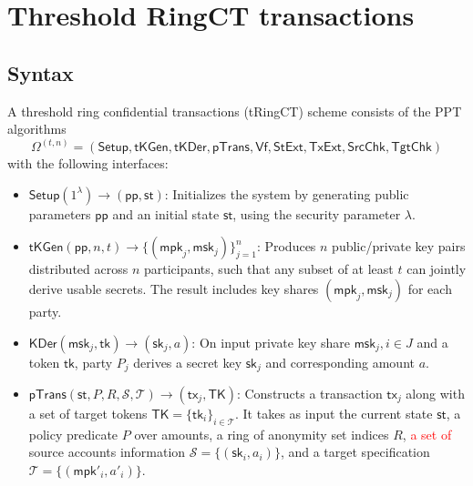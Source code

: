 
\section{Threshold RingCT transactions}

\subsection{Syntax}
\begin{definition}
A threshold ring confidential transactions (\textsf{tRingCT}) scheme consists of the PPT algorithms
\[
\Omega^{(t,n)} = (\textsf{Setup}, \textsf{tKGen}, \textsf{tKDer}, \textsf{pTrans}, \textsf{Vf}, \textsf{StExt}, \textsf{TxExt}, \textsf{SrcChk}, \textsf{TgtChk})
\]
with the following interfaces:

\begin{itemize}
    \item $\mathsf{Setup}(1^\lambda) \rightarrow (\mathsf{pp}, \mathsf{st})$: Initializes the system by generating public parameters $\mathsf{pp}$ and an initial state $\mathsf{st}$, using the security parameter $\lambda$.

    \item $\mathsf{tKGen}(\mathsf{pp}, n, t) \rightarrow \{(\mathsf{mpk}_j, \mathsf{msk}_j)\}_{j=1}^n$: Produces $n$ public/private key pairs distributed across $n$ participants, such that any subset of at least $t$ can jointly derive usable secrets. The result includes key shares $(\mathsf{mpk}_j, \mathsf{msk}_j)$ for each party.

    \item $\mathsf{KDer}(\mathsf{msk}_j, \mathsf{tk}) \rightarrow (\mathsf{sk}_j, a)$: On input private key share $\mathsf{msk}_j, {i \in J}$ and a token $\mathsf{tk}$, party $P_j$ derives a secret key $\mathsf{sk}_j$ and corresponding amount $a$.

    \item $\mathsf{pTrans}(\mathsf{st}, P, R, \mathcal{S}, \mathcal{T}) \rightarrow (\mathsf{tx}_j, \mathsf{TK})$: Constructs a transaction $\mathsf{tx}_j$ along with a set of target tokens $\mathsf{TK} = \{\mathsf{tk}_i\}_{i \in \mathcal{T}}$. It takes as input the current state $\mathsf{st}$, a policy predicate $P$ over amounts, a ring of anonymity set indices $R$, \textcolor{red}{a set of} source accounts information $\mathcal{S} = \{(\mathsf{sk}_i, a_i)\}$, and a target specification $\mathcal{T} = \{(\mathsf{mpk}'_i, a'_i)\}$.


\end{itemize}
\end{definition}
